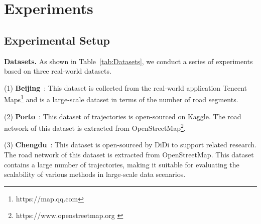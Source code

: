 
\section{Experiments}
\label{sec:6}
\subsection{Experimental Setup}
\noindent \textbf{Datasets.} As shown in Table~\ref{tab:Datasets}, we conduct a series of experiments based on three real-world datasets.

\noindent (1) \textbf{Beijing}~\cite{graphmm}: This dataset is collected from the real-world application Tencent Maps\footnote{https://map.qq.com} and is a large-scale dataset in terms of the number of road segments.

\noindent (2) \textbf{Porto}~\cite{kaggle}: This dataset of trajectories is open-sourced on Kaggle. The road network of this dataset is extracted from OpenStreetMap\footnote{https://www.openstreetmap.org \label{openstreet}}. 

\noindent (3) \textbf{Chengdu}~\cite{didi}: This dataset is open-sourced by DiDi to support related research. The road network of this dataset is extracted from OpenStreetMap. This dataset contains a large number of trajectories, making it suitable for evaluating the scalability of various methods in large-scale data scenarios.

